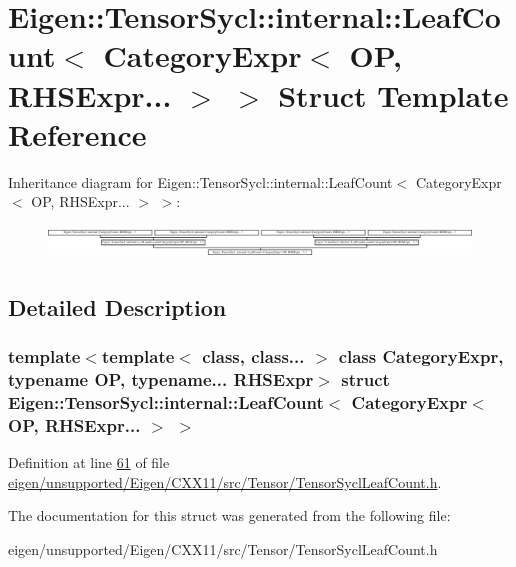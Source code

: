 \hypertarget{struct_eigen_1_1_tensor_sycl_1_1internal_1_1_leaf_count_3_01_category_expr_3_01_o_p_00_01_r_h_s_expr_8_8_8_01_4_01_4}{}\section{Eigen\+:\+:Tensor\+Sycl\+:\+:internal\+:\+:Leaf\+Count$<$ Category\+Expr$<$ OP, R\+H\+S\+Expr... $>$ $>$ Struct Template Reference}
\label{struct_eigen_1_1_tensor_sycl_1_1internal_1_1_leaf_count_3_01_category_expr_3_01_o_p_00_01_r_h_s_expr_8_8_8_01_4_01_4}
Inheritance diagram for Eigen\+:\+:Tensor\+Sycl\+:\+:internal\+:\+:Leaf\+Count$<$ Category\+Expr$<$ OP, R\+H\+S\+Expr... $>$ $>$\+:\begin{figure}[H]
\begin{center}
\leavevmode
\includegraphics[height=0.865979cm]{struct_eigen_1_1_tensor_sycl_1_1internal_1_1_leaf_count_3_01_category_expr_3_01_o_p_00_01_r_h_s_expr_8_8_8_01_4_01_4}
\end{center}
\end{figure}


\subsection{Detailed Description}
\subsubsection*{template$<$template$<$ class, class... $>$ class Category\+Expr, typename OP, typename... R\+H\+S\+Expr$>$\newline
struct Eigen\+::\+Tensor\+Sycl\+::internal\+::\+Leaf\+Count$<$ Category\+Expr$<$ O\+P, R\+H\+S\+Expr... $>$ $>$}



Definition at line \hyperlink{eigen_2unsupported_2_eigen_2_c_x_x11_2src_2_tensor_2_tensor_sycl_leaf_count_8h_source_l00061}{61} of file \hyperlink{eigen_2unsupported_2_eigen_2_c_x_x11_2src_2_tensor_2_tensor_sycl_leaf_count_8h_source}{eigen/unsupported/\+Eigen/\+C\+X\+X11/src/\+Tensor/\+Tensor\+Sycl\+Leaf\+Count.\+h}.



The documentation for this struct was generated from the following file\+:\begin{DoxyCompactItemize}
\item 
eigen/unsupported/\+Eigen/\+C\+X\+X11/src/\+Tensor/\+Tensor\+Sycl\+Leaf\+Count.\+h\end{DoxyCompactItemize}
